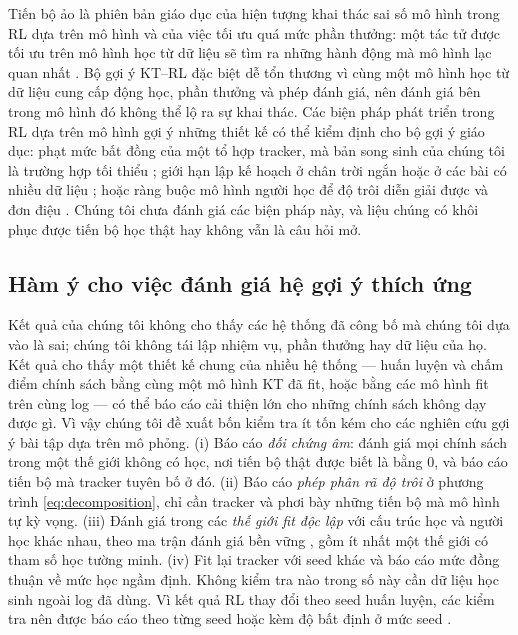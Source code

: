 \documentclass[a4paper,preprint,12pt,authoryear]{elsarticle}
\begin{document}
Tiến bộ ảo là phiên bản giáo dục của hiện tượng khai thác sai số mô hình trong RL dựa trên mô hình và của việc tối ưu quá mức phần thưởng: một tác tử được tối ưu trên mô hình học từ dữ liệu sẽ tìm ra những hành động mà mô hình lạc quan nhất \citep{kurutach2018metrpo,janner2019trust,gao2023scaling,skalse2022reward}. Bộ gợi ý KT--RL đặc biệt dễ tổn thương vì cùng một mô hình học từ dữ liệu cung cấp động học, phần thưởng và phép đánh giá, nên đánh giá bên trong mô hình đó không thể lộ ra sự khai thác. Các biện pháp phát triển trong RL dựa trên mô hình gợi ý những thiết kế có thể kiểm định cho bộ gợi ý giáo dục: phạt mức bất đồng của một tổ hợp tracker, mà bản song sinh của chúng tôi là trường hợp tối thiểu \citep{kurutach2018metrpo,yu2020mopo}; giới hạn lập kế hoạch ở chân trời ngắn hoặc ở các bài có nhiều dữ liệu \citep{janner2019trust}; hoặc ràng buộc mô hình người học để độ trôi diễn giải được và đơn điệu \citep{zhang2023cmkt}. Chúng tôi chưa đánh giá các biện pháp này, và liệu chúng có khôi phục được tiến bộ học thật hay không vẫn là câu hỏi mở.

\subsection{Hàm ý cho việc đánh giá hệ gợi ý thích ứng}

Kết quả của chúng tôi không cho thấy các hệ thống đã công bố mà chúng tôi dựa vào là sai; chúng tôi không tái lập nhiệm vụ, phần thưởng hay dữ liệu của họ. Kết quả cho thấy một thiết kế chung của nhiều hệ thống — huấn luyện và chấm điểm chính sách bằng cùng một mô hình KT đã fit, hoặc bằng các mô hình fit trên cùng log — có thể báo cáo cải thiện lớn cho những chính sách không dạy được gì. Vì vậy chúng tôi đề xuất bốn kiểm tra ít tốn kém cho các nghiên cứu gợi ý bài tập dựa trên mô phỏng. (i) Báo cáo \emph{đối chứng âm}: đánh giá mọi chính sách trong một thế giới không có học, nơi tiến bộ thật được biết là bằng 0, và báo cáo tiến bộ mà tracker tuyên bố ở đó. (ii) Báo cáo \emph{phép phân rã độ trôi} ở phương trình \eqref{eq:decomposition}, chỉ cần tracker và phơi bày những tiến bộ mà mô hình tự kỳ vọng. (iii) Đánh giá trong các \emph{thế giới fit độc lập} với cấu trúc học và người học khác nhau, theo ma trận đánh giá bền vững \citep{doroudi2017rem}, gồm ít nhất một thế giới có tham số học tường minh. (iv) Fit lại tracker với seed khác và báo cáo mức đồng thuận về mức học ngầm định. Không kiểm tra nào trong số này cần dữ liệu học sinh ngoài log đã dùng. Vì kết quả RL thay đổi theo seed huấn luyện, các kiểm tra nên được báo cáo theo từng seed hoặc kèm độ bất định ở mức seed \citep{henderson2018matters,agarwal2021precipice}.
\end{document}
